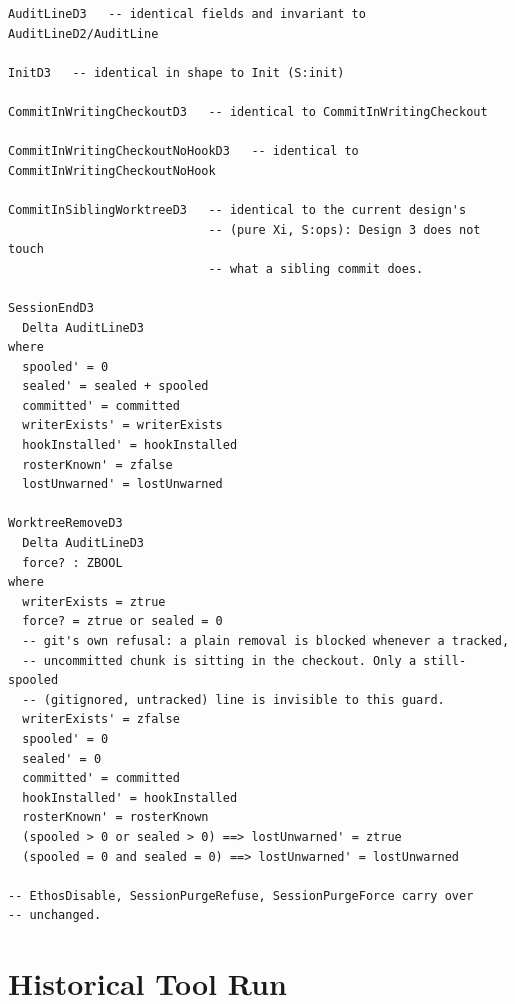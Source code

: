 \documentclass[a4paper,10pt,fleqn]{article}
\begin{document}
\begin{verbatim}
AuditLineD3   -- identical fields and invariant to AuditLineD2/AuditLine

InitD3   -- identical in shape to Init (S:init)

CommitInWritingCheckoutD3   -- identical to CommitInWritingCheckout

CommitInWritingCheckoutNoHookD3   -- identical to CommitInWritingCheckoutNoHook

CommitInSiblingWorktreeD3   -- identical to the current design's
                            -- (pure Xi, S:ops): Design 3 does not touch
                            -- what a sibling commit does.

SessionEndD3
  Delta AuditLineD3
where
  spooled' = 0
  sealed' = sealed + spooled
  committed' = committed
  writerExists' = writerExists
  hookInstalled' = hookInstalled
  rosterKnown' = zfalse
  lostUnwarned' = lostUnwarned

WorktreeRemoveD3
  Delta AuditLineD3
  force? : ZBOOL
where
  writerExists = ztrue
  force? = ztrue or sealed = 0
  -- git's own refusal: a plain removal is blocked whenever a tracked,
  -- uncommitted chunk is sitting in the checkout. Only a still-spooled
  -- (gitignored, untracked) line is invisible to this guard.
  writerExists' = zfalse
  spooled' = 0
  sealed' = 0
  committed' = committed
  hookInstalled' = hookInstalled
  rosterKnown' = rosterKnown
  (spooled > 0 or sealed > 0) ==> lostUnwarned' = ztrue
  (spooled = 0 and sealed = 0) ==> lostUnwarned' = lostUnwarned

-- EthosDisable, SessionPurgeRefuse, SessionPurgeForce carry over
-- unchanged.
\end{verbatim}

\section{Historical Tool Run}
\label{sec:probrun}
\end{document}
